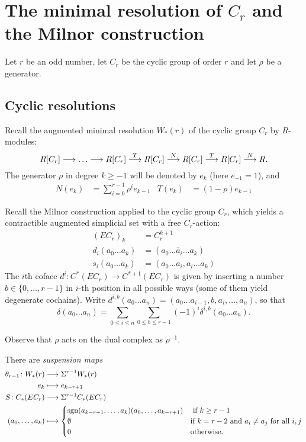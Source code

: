 
\section{The minimal resolution of $C_r$ and the Milnor construction}

Let $r$ be an odd number, let $C_r$ be the cyclic group of order $r$ and let $\rho$ be a generator.

\subsection{Cyclic resolutions}

Recall the augmented minimal resolution $W_*(r)$ of the cyclic group $C_r$ by $R$-modules:
\[R[C_r]\longrightarrow\ldots \longrightarrow R[C_r]\overset{T}{\longrightarrow} R[C_r]\overset{N}{\longrightarrow}R[C_r]\overset{T}{\longrightarrow} R[C_r] \overset{N}{\longrightarrow} R.\]
The generator $\rho$ in degree $k\geq -1$ will be denoted by $e_k$ (here $e_{-1}=1$), and
\begin{align*}
	N(e_k) &= \sum_{i=0}^{r-1} \rho^ie_{k-1} &
	T(e_k) &= (1-\rho)e_{k-1}
\end{align*}

Recall the Milnor construction applied to the cyclic group $C_r$, which yields a contractible augmented simplicial set with a free $C_r$-action:
\begin{align*}
	(EC_r)_k &= C_r^{k+1}\\
	d_i(a_0\ldots a_k) &= (a_0\ldots\hat{a}_i\ldots a_k) \\
	s_i(a_0\ldots a_k) &= (a_0\ldots a_i,a_i\ldots a_k)
\end{align*}
The $i$th coface $d^i\colon C^*(EC_r)\to C^{*+1}(EC_r)$ is given by inserting a number $b\in \{0,\ldots,r-1\}$ in $i$-th position in all possible ways (some of them yield degenerate cochains). Write $d^{i,b}(a_0\ldots a_n) = (a_0\ldots a_{i-1},b,a_i,\ldots, a_n)$, so that
\[\delta(a_0\ldots a_n) = \sum_{0\leq i\leq n}\sum_{0\leq b\leq r-1}(-1)^i \delta^{i,b}(a_0\ldots a_n).\]
\begin{warning}
	Observe that $\rho$ acts on the dual complex as $\rho^{-1}$.
\end{warning}
There are \emph{suspension maps}
\begin{align*}
	\theta_{r-1}\colon W_*(r) & \longrightarrow \Sigma^{r-1}W_*(r) \\
	e_k & \longmapsto e_{k-r+1} \\
	S\colon C_*(EC_r)&\longrightarrow \Sigma^{r-1}C_*(EC_r) \\
	(a_0,\ldots,a_k) & \longmapsto \begin{cases}
		{\operatorname*{sgn}(a_{k-r+1},\ldots,a_{k})} (a_{0},\ldots,a_{k-r+1}) & \text{ if $k\geq r-1$} \\
		\emptyset & \text{if $k = r-2$ and $a_i\neq a_j$ for all $i,j$} \\
		0 & \text{otherwise.}
	\end{cases}
\end{align*}

